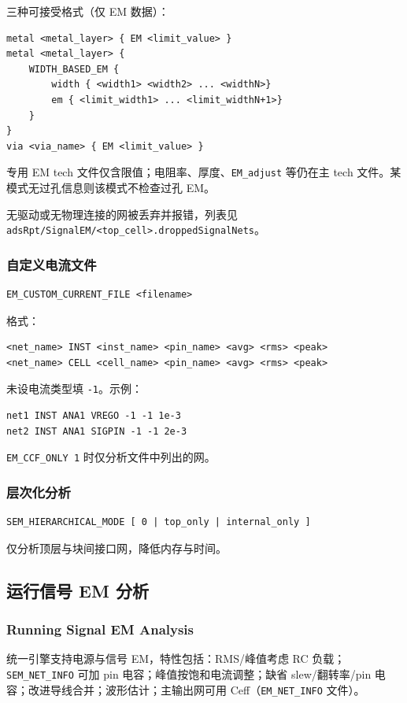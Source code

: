 三种可接受格式（仅 EM 数据）：
\begin{lstlisting}
metal <metal_layer> { EM <limit_value> }
metal <metal_layer> {
    WIDTH_BASED_EM {
        width { <width1> <width2> ... <widthN>}
        em { <limit_width1> ... <limit_widthN+1>}
    }
}
via <via_name> { EM <limit_value> }
\end{lstlisting}

专用 EM tech 文件仅含限值；电阻率、厚度、\texttt{EM\_adjust} 等仍在主 tech 文件。某模式无过孔信息则该模式不检查过孔 EM。

无驱动或无物理连接的网被丢弃并报错，列表见 \texttt{adsRpt/SignalEM/<top\_cell>.droppedSignalNets}。

\subsubsection{自定义电流文件}
\begin{lstlisting}
EM_CUSTOM_CURRENT_FILE <filename>
\end{lstlisting}
格式：
\begin{lstlisting}
<net_name> INST <inst_name> <pin_name> <avg> <rms> <peak>
<net_name> CELL <cell_name> <pin_name> <avg> <rms> <peak>
\end{lstlisting}
未设电流类型填 \texttt{-1}。示例：
\begin{lstlisting}
net1 INST ANA1 VREGO -1 -1 1e-3
net2 INST ANA1 SIGPIN -1 -1 2e-3
\end{lstlisting}
\texttt{EM\_CCF\_ONLY 1} 时仅分析文件中列出的网。

\subsubsection{层次化分析}
\begin{lstlisting}
SEM_HIERARCHICAL_MODE [ 0 | top_only | internal_only ]
\end{lstlisting}
仅分析顶层与块间接口网，降低内存与时间。

\subsection{运行信号 EM 分析}
\subsubsection*{Running Signal EM Analysis}

统一引擎支持电源与信号 EM，特性包括：RMS/峰值考虑 RC 负载；\texttt{SEM\_NET\_INFO} 可加 pin 电容；峰值按饱和电流调整；缺省 slew/翻转率/pin 电容；改进导线合并；波形估计；主输出网可用 Ceff（\texttt{EM\_NET\_INFO} 文件）。


